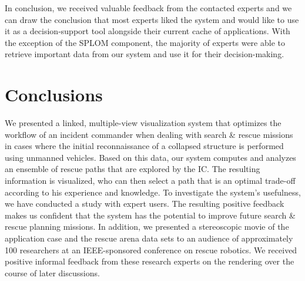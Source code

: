 \documentclass[conference,10pt,letter]{IEEEtran}
\def\IC{IC}
\begin{document}
In conclusion, we received valuable feedback from the contacted experts and we can draw the conclusion that most experts liked the system and would like to use it as a decision-support tool alongside their current cache of applications. With the exception of the SPLOM component, the majority of experts were able to retrieve important data from our system and use it for their decision-making.


\section{Conclusions} \label{sec:conclusion}
We presented a linked, multiple-view visualization system that optimizes the workflow of an incident commander when dealing with search \& rescue missions in cases where the initial reconnaissance of a collapsed structure is performed using unmanned vehicles. Based on this data, our system computes and analyzes an ensemble of rescue paths that are explored by the \IC . The resulting information is visualized, who can then select a path that is an optimal trade-off according to his experience and knowledge. To investigate the system's usefulness, we have conducted a study with expert users. The resulting positive feedback makes us confident that the system has the potential to improve future search \& rescue planning missions. In addition, we presented a stereoscopic movie of the application case and the rescue arena data sets to an audience of approximately 100 researchers at an IEEE-sponsored conference on rescue robotics. We received positive informal feedback from these research experts on the rendering over the course of later discussions.


\end{document}
